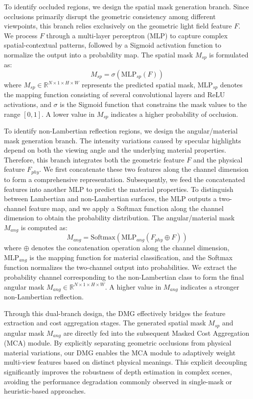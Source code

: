 \documentclass[lettersize,journal]{IEEEtran}
\begin{document}
To identify occluded regions, we design the spatial mask generation branch. Since occlusions primarily disrupt the geometric consistency among different viewpoints, this branch relies exclusively on the geometric light field feature $F$. We process $F$ through a multi-layer perceptron (MLP) to capture complex spatial-contextual patterns, followed by a Sigmoid activation function to normalize the output into a probability map. The spatial mask $M_{sp}$ is formulated as:
\begin{equation}
\label{eq:eq7}
M_{sp} = \sigma(\text{MLP}_{sp}(F))
\end{equation}
where $M_{sp} \in \mathbb{R}^{N \times 1 \times H \times W}$ represents the predicted spatial mask, $\text{MLP}_{sp}$ denotes the mapping function consisting of several convolutional layers and ReLU activations, and $\sigma$ is the Sigmoid function that constrains the mask values to the range $[0, 1]$. A lower value in $M_{sp}$ indicates a higher probability of occlusion.

To identify non-Lambertian reflection regions, we design the angular/material mask generation branch. The intensity variations caused by specular highlights depend on both the viewing angle and the underlying material properties. Therefore, this branch integrates both the geometric feature $F$ and the physical feature $F_{phy}$. We first concatenate these two features along the channel dimension to form a comprehensive representation. Subsequently, we feed the concatenated features into another MLP to predict the material properties. To distinguish between Lambertian and non-Lambertian surfaces, the MLP outputs a two-channel feature map, and we apply a Softmax function along the channel dimension to obtain the probability distribution. The angular/material mask $M_{ang}$ is computed as:
\begin{equation}
\label{eq:eq8}
M_{ang} = \text{Softmax}(\text{MLP}_{ang}(F_{phy} \oplus F))
\end{equation}
where $\oplus$ denotes the concatenation operation along the channel dimension, $\text{MLP}_{ang}$ is the mapping function for material classification, and the Softmax function normalizes the two-channel output into probabilities. We extract the probability channel corresponding to the non-Lambertian class to form the final angular mask $M_{ang} \in \mathbb{R}^{N \times 1 \times H \times W}$. A higher value in $M_{ang}$ indicates a stronger non-Lambertian reflection.

Through this dual-branch design, the DMG effectively bridges the feature extraction and cost aggregation stages. The generated spatial mask $M_{sp}$ and angular mask $M_{ang}$ are directly fed into the subsequent Masked Cost Aggregation (MCA) module. By explicitly separating geometric occlusions from physical material variations, our DMG enables the MCA module to adaptively weight multi-view features based on distinct physical meanings. This explicit decoupling significantly improves the robustness of depth estimation in complex scenes, avoiding the performance degradation commonly observed in single-mask or heuristic-based approaches.
\end{document}

